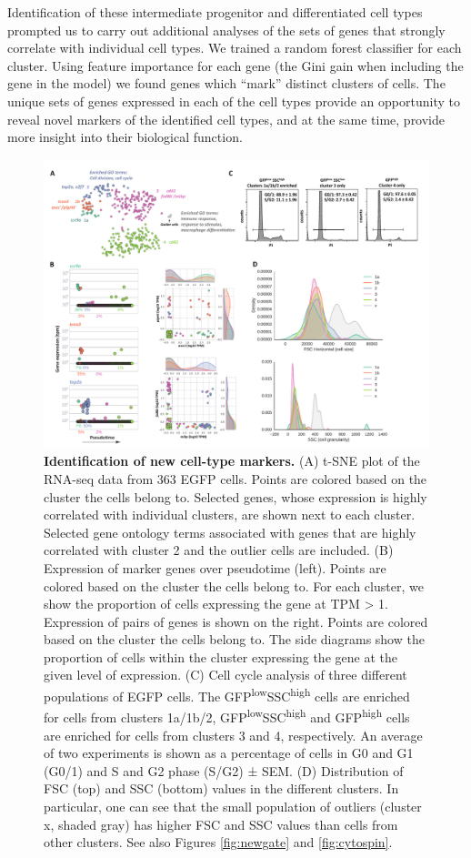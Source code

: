 Identification of these intermediate progenitor and differentiated cell types prompted us to carry out additional analyses of the sets of genes that strongly correlate with individual cell types. We trained a random forest classifier for each cluster. Using feature importance for each gene (the Gini gain when including the gene in the model) we found genes which ``mark'' distinct clusters of cells. The unique sets of genes expressed in each of the cell types provide an opportunity to reveal novel markers of the identified cell types, and at the same time, provide more insight into their biological function.

\begin{figure}
    \centering
    \includegraphics[width=\textwidth]{"Figure4"}
    \caption[Identification of new cell-type markers]{\textbf{Identification of new cell-type markers.} (A) t-SNE plot of the RNA-seq data from 363 EGFP cells. Points are colored based on the cluster the cells belong to. Selected genes, whose expression is highly correlated with individual clusters, are shown next to each cluster. Selected gene ontology terms associated with genes that are highly correlated with cluster 2 and the outlier cells are included. (B) Expression of marker genes over pseudotime (left). Points are colored based on the cluster the cells belong to. For each cluster, we show the proportion of cells expressing the gene at TPM > 1. Expression of pairs of genes is shown on the right. Points are colored based on the cluster the cells belong to. The side diagrams show the proportion of cells within the cluster expressing the gene at the given level of expression. (C) Cell cycle analysis of three different populations of EGFP cells. The GFP\textsuperscript{low}SSC\textsuperscript{high} cells are enriched for cells from clusters 1a/1b/2, GFP\textsuperscript{low}SSC\textsuperscript{high} and GFP\textsuperscript{high} cells are enriched for cells from clusters 3 and 4, respectively. An average of two experiments is shown as a percentage of cells in G0 and G1 (G0/1) and S and G2 phase (S/G2) ± SEM. (D) Distribution of FSC (top) and SSC (bottom) values in the different clusters. In particular, one can see that the small population of outliers (cluster x, shaded gray) has higher FSC and SSC values than cells from other clusters. See also Figures \ref{fig:newgate} and \ref{fig:cytospin}.}

\end{figure}
